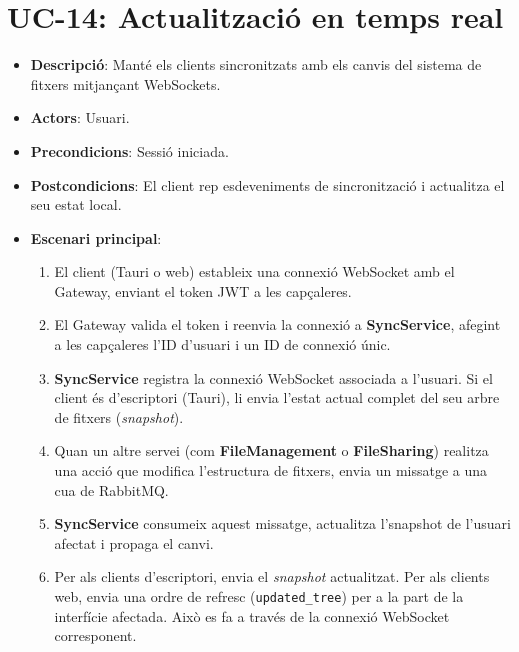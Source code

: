 \section{UC-14: Actualització en temps real}
\begin{itemize}
    \item \textbf{Descripció}: Manté els clients sincronitzats amb els canvis del sistema de fitxers mitjançant WebSockets.
    \item \textbf{Actors}: Usuari.
    \item \textbf{Precondicions}: Sessió iniciada.
    \item \textbf{Postcondicions}: El client rep esdeveniments de sincronització i actualitza el seu estat local.
    \item \textbf{Escenari principal}:
    \begin{enumerate}
        \item El client (Tauri o web) estableix una connexió WebSocket amb el Gateway, enviant el token JWT a les capçaleres.
        \item El Gateway valida el token i reenvia la connexió a \textbf{SyncService}, afegint a les capçaleres l'ID d'usuari i un ID de connexió únic.
        \item \textbf{SyncService} registra la connexió WebSocket associada a l'usuari. Si el client és d'escriptori (Tauri), li envia l'estat actual complet del seu arbre de fitxers (\textit{snapshot}).
        \item Quan un altre servei (com \textbf{FileManagement} o \textbf{FileSharing}) realitza una acció que modifica l'estructura de fitxers, envia un missatge a una cua de RabbitMQ.
        \item \textbf{SyncService} consumeix aquest missatge, actualitza l'snapshot de l'usuari afectat i propaga el canvi.
        \item Per als clients d'escriptori, envia el \textit{snapshot} actualitzat. Per als clients web, envia una ordre de refresc (\texttt{updated\_tree}) per a la part de la interfície afectada. Això es fa a través de la connexió WebSocket corresponent.
    \end{enumerate}
\end{itemize}

